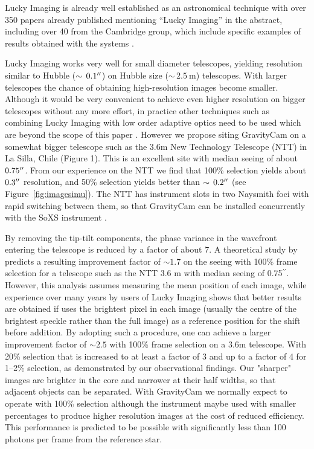 \documentclass{pasa}%
\newcommand\arcsec{\hbox{$^{\prime\prime}$}}
\begin{document}
Lucky Imaging is already well established as an astronomical technique with over 350 papers already published mentioning ``Lucky Imaging'' in the abstract, including over 40 from the Cambridge group, which include specific examples of results obtained with the systems \citep{Law+2006,Scardia+2007,Mackay+2008,Law+2009,Faedi+2013,Mackay2013}.

Lucky Imaging works very well for small diameter telescopes, yielding resolution similar to Hubble ($\sim\,0.1\arcsec$) on Hubble size ($\sim\,2.5~\mbox{m}$) telescopes.  With larger telescopes the chance of obtaining high-resolution images become smaller.  Although it would be very convenient to achieve even higher resolution on bigger telescopes without any more effort, in practice other techniques such as combining Lucky Imaging with low order adaptive optics need to be used which are beyond the scope of this paper \citep{Law+2009}.  However we propose siting \mbox{GravityCam} on a somewhat bigger telescope such as the 3.6m New Technology Telescope (NTT) in La Silla, Chile (Figure 1).  This is an excellent site with median seeing of about $0.75\arcsec$.  From our experience on the NTT we find that 100\% selection yields about $0.3\arcsec$ resolution, and 50\% selection yields better than $\sim\,0.2\arcsec$ (see Figure~\ref{fig:imagesimu}). The NTT has instrument slots in two Naysmith foci with rapid switching between them, so that \mbox{GravityCam} can be installed concurrently with the SoXS instrument \citep{SoXS}.

By removing the tip-tilt components, the phase variance in the wavefront entering the telescope is reduced by a factor of about 7. A theoretical study by \citet{Kaiser} predicts a resulting improvement factor of $\sim 1.7$ on the seeing with 100\% frame selection for a telescope such as the NTT 3.6 m with median seeing of 0.75\arcsec. However, this analysis assumes measuring the mean position of each image, while
experience over many years by users of Lucky Imaging shows that better results are obtained if uses the brightest pixel in each image (usually the centre of the brightest speckle rather than the full image) as a reference position for the shift before addition. By adopting such a procedure, one can achieve a larger improvement factor of $\sim 2.5$ with 100\% frame selection on a 3.6m telescope. With 20\% selection that is increased to at least a factor of 3 and up to a factor of 4 for 1--2\% selection,
as demonstrated by our observational findings. Our "sharper" images are brighter in the core and narrower at their half widths, so that adjacent objects can be separated.
With \mbox{GravityCam} we normally expect to operate with 100\% selection although
the instrument maybe used with smaller percentages to produce higher
resolution images at the cost of reduced efficiency. This performance is
predicted to be possible with significantly less than 100 photons per
frame from the reference star.
\end{document}
